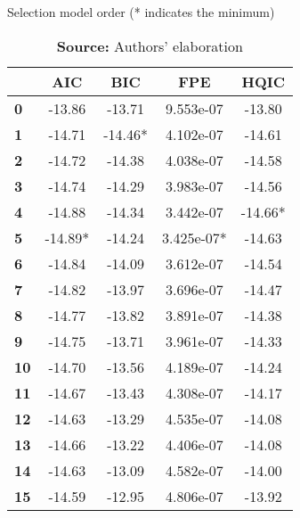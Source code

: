 \begin{table}
\caption{Selection model order (* indicates the minimum)}
\label{criterios}
\centering
\begin{tabular}{lcccc}
\toprule
            & \textbf{AIC} & \textbf{BIC} & \textbf{FPE} & \textbf{HQIC}  \\
\midrule
\textbf{0}  &      -13.86  &      -13.71  &   9.553e-07  &       -13.80   \\
\textbf{1}  &      -14.71  &     -14.46*  &   4.102e-07  &       -14.61   \\
\textbf{2}  &      -14.72  &      -14.38  &   4.038e-07  &       -14.58   \\
\textbf{3}  &      -14.74  &      -14.29  &   3.983e-07  &       -14.56   \\
\textbf{4}  &      -14.88  &      -14.34  &   3.442e-07  &      -14.66*   \\
\textbf{5}  &     -14.89*  &      -14.24  &  3.425e-07*  &       -14.63   \\
\textbf{6}  &      -14.84  &      -14.09  &   3.612e-07  &       -14.54   \\
\textbf{7}  &      -14.82  &      -13.97  &   3.696e-07  &       -14.47   \\
\textbf{8}  &      -14.77  &      -13.82  &   3.891e-07  &       -14.38   \\
\textbf{9}  &      -14.75  &      -13.71  &   3.961e-07  &       -14.33   \\
\textbf{10} &      -14.70  &      -13.56  &   4.189e-07  &       -14.24   \\
\textbf{11} &      -14.67  &      -13.43  &   4.308e-07  &       -14.17   \\
\textbf{12} &      -14.63  &      -13.29  &   4.535e-07  &       -14.08   \\
\textbf{13} &      -14.66  &      -13.22  &   4.406e-07  &       -14.08   \\
\textbf{14} &      -14.63  &      -13.09  &   4.582e-07  &       -14.00   \\
\textbf{15} &      -14.59  &      -12.95  &   4.806e-07  &       -13.92   \\
\bottomrule
\end{tabular}
\caption*{\textbf{Source:} Authors' elaboration}
\end{table}